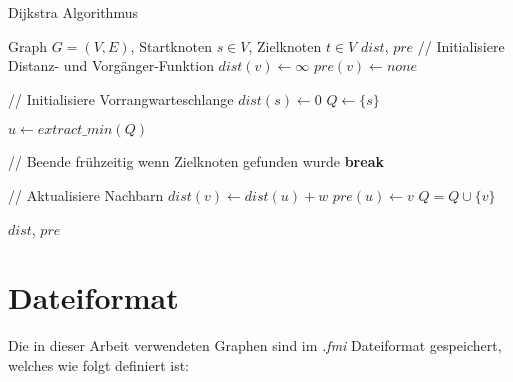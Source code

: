 \begin{algorithm}[ht]
    \caption{Dijkstra Algorithmus}
    \begin{algorithmic}[1]
        \Require Graph $G = (V, E)$, Startknoten $s \in V$, Zielknoten $t \in V$
        \Ensure ${dist}$, ${pre}$
        \State // Initialisiere Distanz- und Vorgänger-Funktion
        \State ${dist}(v) \leftarrow \infty$
        \State ${pre}(v) \leftarrow {none}$
        \EndFor


        \State
        \State // Initialisiere Vorrangwarteschlange
        \State ${dist}(s) \leftarrow 0$
        \State $Q\leftarrow \{ s \}$

        \State
        \State $u \leftarrow{extract\_min}(Q)$\label{graphs:dijkstra:pop}

        \State
        \State // Beende frühzeitig wenn Zielknoten gefunden wurde
        \State \textbf{break}
        \EndIf

        \State
        \State // Aktualisiere Nachbarn
        \State ${dist}(v) \leftarrow {dist}(u) + w$
        \State ${pre}(u) \leftarrow v$
        \State $Q = Q \cup \{ v \}$
        \EndIf
        \EndFor

        \EndWhile

        \State
        \State \Return ${dist}$, ${pre}$
    \end{algorithmic}
\end{algorithm}


\section{Dateiformat}

Die in dieser Arbeit verwendeten Graphen sind im \emph{.fmi} Dateiformat gespeichert, welches wie folgt definiert ist:

